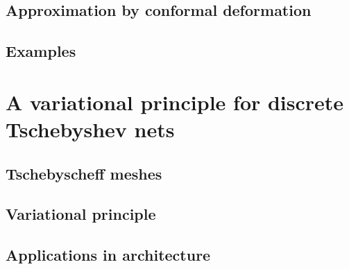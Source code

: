 \subsection{Approximation by conformal deformation}
\subsection{Examples}

\section{A variational principle for discrete Tschebyshev nets}
\subsection{Tschebyscheff meshes}
\subsection{Variational principle}
\subsection{Applications in architecture}

